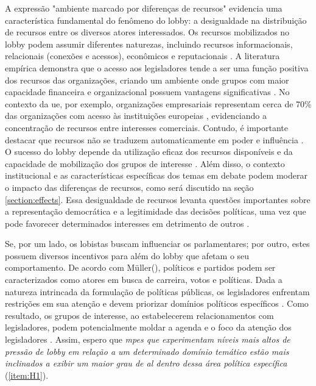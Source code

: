 A expressão "ambiente marcado por diferenças de recursos" evidencia uma característica fundamental do fenômeno do lobby: a desigualdade na distribuição de recursos entre os diversos atores interessados. Os recursos mobilizados no lobby podem assumir diferentes naturezas, incluindo recursos informacionais, relacionais (conexões e acessos), econômicos e reputacionais \cite{Pop2013Lobbying}. A literatura empírica demonstra que o acesso aos legisladores tende a ser uma função positiva dos recursos das organizações, criando um ambiente onde grupos com maior capacidade financeira e organizacional possuem vantagens significativas \cite{dur2007question, eising2007institutional}. No contexto da \acrshort{ue}, por exemplo, organizações empresariais representam cerca de 70\% das organizações com acesso às instituições europeias \cite{Coen2007}, evidenciando a concentração de recursos entre interesses comerciais. Contudo, é importante destacar que recursos não se traduzem automaticamente em poder e influência \cite{simon_notes_1953}. O sucesso do lobby depende da utilização eficaz dos recursos disponíveis e da capacidade de mobilização dos grupos de interesse \cite{Pop2013Lobbying}. Além disso, o contexto institucional e as características específicas dos temas em debate podem moderar o impacto das diferenças de recursos, como será discutido na seção \ref{section:effects}. Essa desigualdade de recursos levanta questões importantes sobre a representação democrática e a legitimidade das decisões políticas, uma vez que pode favorecer determinados interesses em detrimento de outros \cite{kohler2007desmyth}.

Se, por um lado, os lobistas buscam influenciar os parlamentares; por outro, estes possuem diversos incentivos para além do lobby que afetam o seu comportamento. De acordo com Müller(\citeyear{muller1999}), políticos e partidos podem ser caracterizados como atores em busca de carreira, votos e políticas. Dada a natureza intrincada da formulação de políticas públicas, os legisladores enfrentam restrições em sua atenção e devem priorizar domínios políticos específicos \cite{Hall2006, jones2005politics}. Como resultado, os grupos de interesse, ao estabelecerem relacionamentos com legisladores, podem potencialmente moldar a agenda e o foco da atenção dos legisladores \cite{Huwyler2022}. Assim, espero que \emph{\acrshort{mpe}s que experimentam níveis mais altos de pressão de lobby em relação a um determinado domínio temático estão mais inclinados a exibir um maior grau de \acrshort{al} dentro dessa área política específica} (\ref{item:H1}).

